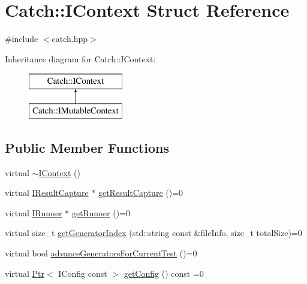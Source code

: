 \hypertarget{structCatch_1_1IContext}{\section{Catch\-:\-:I\-Context Struct Reference}
\label{structCatch_1_1IContext}
}


{\ttfamily \#include $<$catch.\-hpp$>$}

Inheritance diagram for Catch\-:\-:I\-Context\-:\begin{figure}[H]
\begin{center}
\leavevmode
\includegraphics[height=2.000000cm]{structCatch_1_1IContext}
\end{center}
\end{figure}
\subsection*{Public Member Functions}
\begin{DoxyCompactItemize}
\item 
virtual \hyperlink{structCatch_1_1IContext_aeb17355c1be6c2ced5407cad7202628d}{$\sim$\-I\-Context} ()
\item 
virtual \hyperlink{structCatch_1_1IResultCapture}{I\-Result\-Capture} $\ast$ \hyperlink{structCatch_1_1IContext_a684e4ae71d1fdf3060c352ecde1d122f}{get\-Result\-Capture} ()=0
\item 
virtual \hyperlink{structCatch_1_1IRunner}{I\-Runner} $\ast$ \hyperlink{structCatch_1_1IContext_af088415dde18d039ed5a2f95b02767c6}{get\-Runner} ()=0
\item 
virtual size\-\_\-t \hyperlink{structCatch_1_1IContext_a43e07088db43299ba129fbe6d3106e95}{get\-Generator\-Index} (std\-::string const \&file\-Info, size\-\_\-t total\-Size)=0
\item 
virtual bool \hyperlink{structCatch_1_1IContext_a806f7c4ed24d51adae90418e661b24b7}{advance\-Generators\-For\-Current\-Test} ()=0
\item 
virtual \hyperlink{classCatch_1_1Ptr}{Ptr}$<$ I\-Config const  $>$ \hyperlink{structCatch_1_1IContext_aee81c415899262e096ad8d6f686fa365}{get\-Config} () const =0
\end{DoxyCompactItemize}


